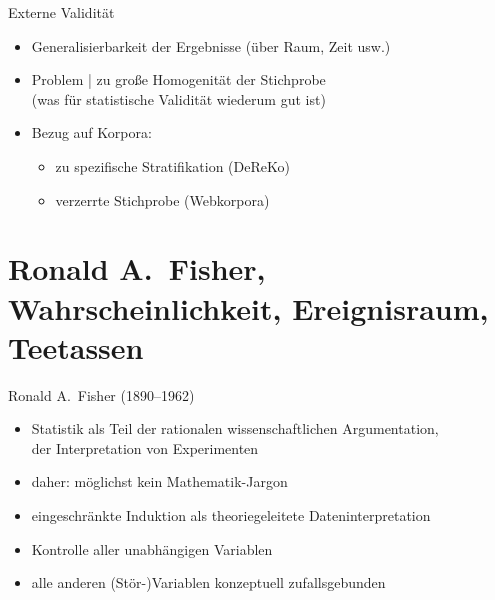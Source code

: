 \begin{frame}
  {Externe Validität}
  \begin{itemize}[<+->]
    \item \alert{Generalisierbarkeit der Ergebnisse} (über Raum, Zeit usw.)
      \Zeile
    \item Problem | \alert{zu große Homogenität der Stichprobe}\\
      (was für statistische Validität wiederum gut ist)
      \Halbzeile
    \item Bezug auf Korpora:
      \begin{itemize}[<+->]
	\item zu spezifische Stratifikation (DeReKo)
	\item verzerrte Stichprobe (Webkorpora)
      \end{itemize}
  \end{itemize}
\end{frame}

\section{Ronald A.\ Fisher, Wahrscheinlichkeit, Ereignisraum, Teetassen}

\begin{frame}
  {Ronald A.\ Fisher (1890--1962)}
  \begin{itemize}[<+->]
    \item Statistik als Teil der rationalen wissenschaftlichen Argumentation,\\
      der Interpretation von Experimenten
    \item daher: möglichst kein Mathematik-Jargon
    \item eingeschränkte Induktion als theoriegeleitete Dateninterpretation
    \item Kontrolle aller unabhängigen Variablen
    \item \alert{alle anderen (Stör-)Variablen konzeptuell zufallsgebunden}
  \end{itemize}
\end{frame}


